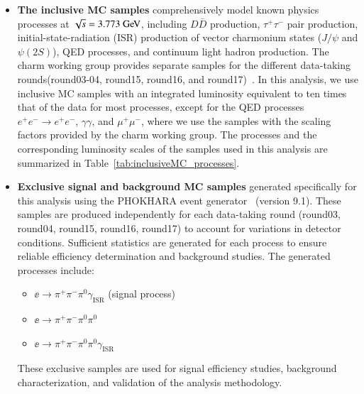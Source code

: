 \begin{itemize}
    \item \textbf{The inclusive MC samples} comprehensively model known physics processes at $\sqrt{s}=3.773\gev$, including $D\bar{D}$ production, $\tau^+\tau^-$ pair production, initial-state-radiation (ISR) production of vector charmonium states ($J/\psi$ and $\psi(2S)$), QED processes, and continuum light hadron production. The charm working group provides separate samples for the different data-taking rounds(round03-04, round15, round16, and round17)~\cite{BESIII_MEMO_INCLUSIVE}. In this analysis, we use inclusive MC samples with an integrated luminosity equivalent to ten times that of the data for most processes, except for the QED processes $e^+e^- \to e^+e^-$, $\gamma \gamma$, and $\mu^+\mu^-$, where we use the samples with the scaling factors provided by the charm working group. The processes and the corresponding luminosity scales of the samples used in this analysis are summarized in Table~\ref{tab:inclusiveMC_processes}.

    \item \textbf{Exclusive signal and background MC samples} generated specifically for this analysis using the \textsc{PHOKHARA} event generator~\cite{Czyz2006,Rodrigo2001,Rodrigo2002} (version 9.1). These samples are produced independently for each data-taking round (round03, round04, round15, round16, round17) to account for variations in detector conditions. Sufficient statistics are generated for each process to ensure reliable efficiency determination and background studies. The generated processes include:
          \begin{itemize}
              \item $\ee\to \pi^+\pi^-\pi^0\gamma_{\text{ISR}}$ (signal process)
              \item $\ee\to \pi^+\pi^-\pi^0\pi^0$
              \item $\ee\to \pi^+\pi^-\pi^0\pi^0\gamma_{\text{ISR}}$
          \end{itemize}
          These exclusive samples are used for signal efficiency studies, background characterization, and validation of the analysis methodology.
\end{itemize}